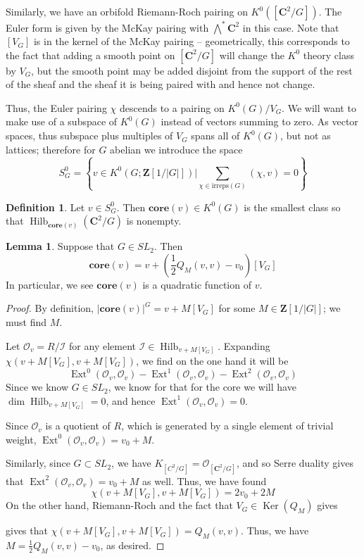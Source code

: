 \documentclass{amsart}[12pt]
\theoremstyle{definition}
\newtheorem{lemma}[dummy]{Lemma}
\newtheorem{definition}[dummy]{Definition}
\newcommand{\Z}{\mathbf{Z}}
\newcommand{\C}{\mathbf{C}}
\newcommand{\OO}{\mathcal{O}}
\newcommand{\core}{\mathbf{core}}
\newcommand{\irreps}{\text{irreps}}
\DeclareMathOperator{\Hilb}{Hilb}
\DeclareMathOperator{\Ext}{Ext}
\DeclareMathOperator{\Ker}{Ker}
\begin{document}
Similarly, we have an orbifold Riemann-Roch pairing on $K^0([\C^2/G])$.  The Euler form is given by the McKay pairing with $\bigwedge^* \C^2$ in this case.  Note that $[V_G]$ is in the kernel of the McKay pairing -- geometrically, this corresponds to the fact that adding a smooth point on $[\C^2/G]$ will change the $K^0$ theory class by $V_G$, but the smooth point may be added disjoint from the support of the rest of the sheaf and the sheaf it is being paired with and hence not change.

Thus, the Euler pairing $\chi$ descends to a pairing on $K^0(G)/V_G$.  We will want to make use of a subspace of $K^0(G)$ instead of vectors summing to zero.  As vector spaces, thus subspace plus multiples of $V_G$ spans all of $K^0(G)$, but not as lattices; therefore for $G$ abelian we introduce the space 
$$S^0_G=\left\{v\in K^0(G; \Z[1/|G|])\Bigg | \sum_{\chi\in\irreps(G)}(\chi, v)=0\right\}$$

\begin{definition}
Let $v\in S^0_G$.  Then $\core(v)\in K^0(G)$ is the smallest class so that $\Hilb_{\core(v)}(\C^2/G)$ is nonempty.
\end{definition}


\begin{lemma} Suppose that $G\in SL_2$. Then
$$\core(v)=v+(\frac{1}{2}Q_M(v,v)-v_0)[V_G]$$
In particular, we see $\core(v)$ is a quadratic function of $v$.
\end{lemma}

\begin{proof}
By definition, $|\core(v)|^G=v+M[V_G]$ for some $M\in\Z[1/|G|]$; we must find $M$.

Let $\OO_v=R/\mathcal{I}$ for any element $\mathcal{I}\in\Hilb_{v+M[V_G]}$.  Expanding $\chi(v+M[V_G], v+M[V_G])$, we find on the one hand it will be
$$\Ext^0(\OO_v,\OO_v)-\Ext^1(\OO_v,\OO_v)-\Ext^2(\OO_v,\OO_v)$$
Since we know $G\in SL_2$, we know for that for the core we will have $\dim\Hilb_{v+M[V_G]}=0$, and hence $\Ext^1(\OO_v,\OO_v)=0$.

Since $\OO_v$ is a quotient of $R$, which is generated by a single element of trivial weight, $\Ext^0(\OO_v,\OO_v)=v_0+M$.

Similarly, since $G\subset SL_2$, we have $K_{[C^2/G]}=\OO_{[\C^2/G]}$, and so Serre duality gives that $\Ext^2(\OO_v,\OO_v)=v_0+M$ as well.  Thus, we have found
$$\chi(v+M[V_G],v+M[V_G])=2v_0+2M$$
On the other hand, Riemann-Roch and the fact that $V_G\in\Ker(Q_{M})$ gives

gives that $\chi(v+M[V_G],v+M[V_G])=Q_M(v,v)$.  Thus, we have $M=\frac{1}{2}Q_M(v,v)-v_0$, as desired.
\end{proof}
\end{document}
